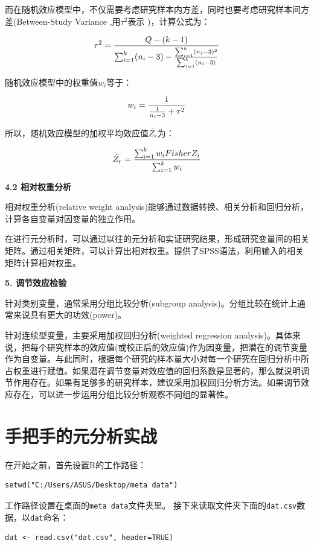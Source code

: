 \documentclass[
]{book}
\begin{document}
而在随机效应模型中，不仅需要考虑研究样本内方差，同时也要考虑研究样本间方差(Between-Study Variance ,用\(\tau^{2}\)表示 )，计算公式为：

\[
\tau^{2}={{Q-(k-1)}\over{\sum_{i=1}^{k}(n_{i}-3)-{{\sum_{i=1}^{k}(n_{i}-3)^{2}}\over{\sum_{i=1}^{k}(n_{i}-3)}}}}
\]

随机效应模型中的权重值\(w_{i}\)等于：

\[
w_{i}={{1}\over{{{1}\over{n_{i}-3}}+\tau^{2}}}
\]

所以，随机效应模型的加权平均效应值\(\bar{Z_{r}}\)为：

\[
\bar{Z_{r}}={{\sum_{i=1}^{k}w_{i}FisherZ_{i}}\over{\sum_{i=1}^{k}w_{i}}}
\]

\textbf{4.2 相对权重分析}

相对权重分析(relative weight analysis)能够通过数据转换、相关分析和回归分析，计算各自变量对因变量的独立作用\autocite{xuyan2019:RNG}。

在进行元分析时，可以通过以往的元分析和实证研究结果，形成研究变量间的相关矩阵。通过相关矩阵，可以计算出相对权重。\autocite{Lebreton2008:RNG}提供了SPSS语法，利用输入的相关矩阵计算相对权重。

\textbf{5. 调节效应检验}

针对类别变量，通常采用分组比较分析(subgroup analysis)。分组比较在统计上通常来说具有更大的功效(power)。

针对连续型变量，主要采用加权回归分析(weighted regression analysis)。具体来说，把每个研究样本的效应值(或校正后的效应值)作为因变量，把潜在的调节变量作为自变量。与此同时，根据每个研究的样本量大小对每一个研究在回归分析中所占权重进行赋值。如果潜在调节变量对效应值的回归系数是显著的，那么就说明调节作用存在。如果有足够多的研究样本，建议采用加权回归分析方法。如果调节效应存在，可以进一步运用分组比较分析观察不同组的显著性。

\hypertarget{meta-practice}{%
\section{手把手的元分析实战}\label{meta-practice}}

在开始之前，首先设置R的工作路径：

\begin{verbatim}
setwd("C:/Users/ASUS/Desktop/meta data")
\end{verbatim}

工作路径设置在桌面的\texttt{meta\ data}文件夹里。
接下来读取文件夹下面的\texttt{dat.csv}数据，以\texttt{dat}命名：

\begin{verbatim}
dat <- read.csv("dat.csv", header=TRUE)
\end{verbatim}
\end{document}
